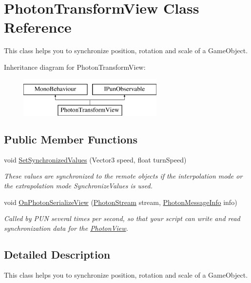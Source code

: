 \hypertarget{class_photon_transform_view}{}\section{Photon\+Transform\+View Class Reference}
\label{class_photon_transform_view}


This class helps you to synchronize position, rotation and scale of a Game\+Object.  


Inheritance diagram for Photon\+Transform\+View\+:\begin{figure}[H]
\begin{center}
\leavevmode
\includegraphics[height=2.000000cm]{class_photon_transform_view}
\end{center}
\end{figure}
\subsection*{Public Member Functions}
\begin{DoxyCompactItemize}
\item 
void \hyperlink{class_photon_transform_view_a914782b6d7ec46386636fa9fbaaa8f1f}{Set\+Synchronized\+Values} (Vector3 speed, float turn\+Speed)
\begin{DoxyCompactList}\small\item\em These values are synchronized to the remote objects if the interpolation mode or the extrapolation mode Synchronize\+Values is used. \end{DoxyCompactList}\item 
void \hyperlink{class_photon_transform_view_a5d1d6606c9c935b2326b31b292f37a7e}{On\+Photon\+Serialize\+View} (\hyperlink{class_photon_stream}{Photon\+Stream} stream, \hyperlink{class_photon_message_info}{Photon\+Message\+Info} info)
\begin{DoxyCompactList}\small\item\em Called by P\+UN several times per second, so that your script can write and read synchronization data for the \hyperlink{class_photon_view}{Photon\+View}. \end{DoxyCompactList}\end{DoxyCompactItemize}


\subsection{Detailed Description}
This class helps you to synchronize position, rotation and scale of a Game\+Object. 


